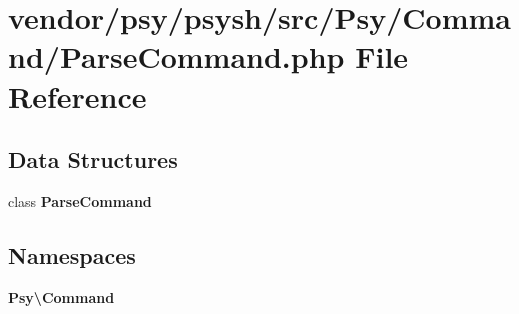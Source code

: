 \section{vendor/psy/psysh/src/\+Psy/\+Command/\+Parse\+Command.php File Reference}
\label{_parse_command_8php}
\subsection*{Data Structures}
\begin{DoxyCompactItemize}
\item 
class {\bf Parse\+Command}
\end{DoxyCompactItemize}
\subsection*{Namespaces}
\begin{DoxyCompactItemize}
\item 
 {\bf Psy\textbackslash{}\+Command}
\end{DoxyCompactItemize}
